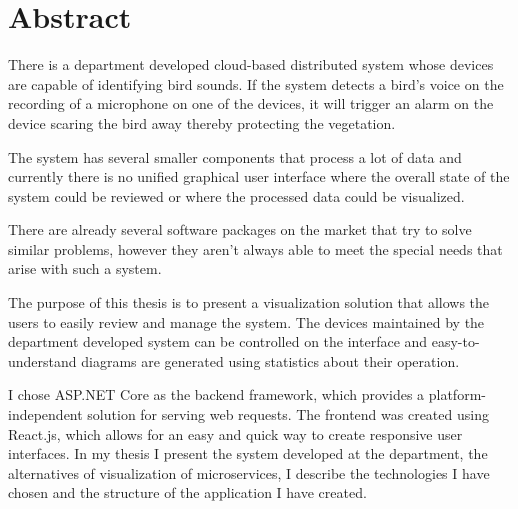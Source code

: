 \chapter*{Abstract}

There is a department developed cloud-based distributed system whose devices are capable of identifying bird sounds.
If the system detects a bird's voice on the recording of a microphone on one of the devices, it will trigger
an alarm on the device scaring the bird away thereby protecting the vegetation.

The system has several smaller components that process a lot of data and currently there is no unified graphical user interface where the overall state of the system 
could be reviewed or where the processed data could be visualized.

There are already several software packages on the market that try to solve similar problems, 
however they aren't always able to meet the special needs that arise with such a system.

The purpose of this thesis is to present a visualization solution that allows the users to easily review
and manage the system. The devices maintained by the department developed system can be controlled on the interface
and easy-to-understand diagrams are generated using statistics about their operation.

I chose ASP.NET Core as the backend framework, which provides a platform-independent solution for serving web requests.
The frontend was created using React.js, which allows for an easy and quick way to create responsive user interfaces.
In my thesis I present the system developed at the department, the alternatives of visualization of microservices,
I describe the technologies I have chosen and the structure of the application I have created.

\vfill
\selectthesislanguage

\setcounter{romanPage}{\value{page}}
